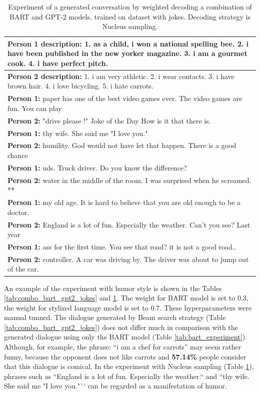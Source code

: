 \begin{table}[H]
\centering
 \begin{tabular}{|p{14cm}|} 
 \hline
 \textbf{Person 1 description:} 1. as a child, i won a national spelling bee. 2. i have been published in the new yorker magazine. 3. i am a gourmet cook. 4. i have perfect pitch. \\
 \hline
 \textbf{Person 2 description:} 1. i am very athletic. 2. i wear contacts. 3. i have brown hair. 4. i love bicycling. 5. i hate carrots. \\
 \hline
 \textbf{Person 1:} paper has one of the best video games ever. The video games are fun. You can play \\ 
 \textbf{Person 2:} "drive please !" Joke of the Day How is it that there is. \\
 \textbf{Person 1:} thy wife. She said me "I love you."  \\
 \textbf{Person 2:} humility. God would not have let that happen. There is a good chance\\
 \textbf{Person 1:} uds. Truck driver. Do you know the difference? \\
 \textbf{Person 2:} water in the middle of the room. I was surprised when he screamed. **  \\
 \textbf{Person 1:} my old age. It is hard to believe that you are old enough to be a doctor. \\
 \textbf{Person 2:} England is a lot of fun. Especially the weather. Can't you see? Last year \\
 \textbf{Person 1:} ass for the first time. You see that road? it is not a good road.. \\
 \textbf{Person 2:} controller. A car was driving by. The driver was about to jump out of the car. \\
 \hline
 \end{tabular}
 \caption{Experiment of a generated conversation by weighted decoding a combination of BART and GPT-2 models, trained on dataset with jokes. Decoding strategy is Nucleus sampling.}
\label{tab:jokes_nucleus}
\end{table}

An example of the experiment with humor style is shown in the Tables \ref{tab:combo_bart_gpt2_jokes} and \ref{tab:jokes_nucleus}. The weight for BART model is set to 0.3, the weight for stylized language model is set to 0.7. These hyperparameters were manual tunned. The dialogue generated by Beam search strategy (Table \ref{tab:combo_bart_gpt2_jokes}) does not differ much in comparison with the generated dialogue using only the BART model (Table \ref{tab:bart_experiment}). Although, for example, the phrase: ``i am a chef for carrots'' may seem rather funny, because the opponent does not like carrots and \textbf{57.14\%} people consider that this dialogue is comical. In the experiment with Nucleus sampling (Table \ref{tab:jokes_nucleus}), phrases such as ``England is a lot of fun. Especially the weather.`` and ``thy wife. She said me "I love you."`` can be regarded as a manifestation of humor.

